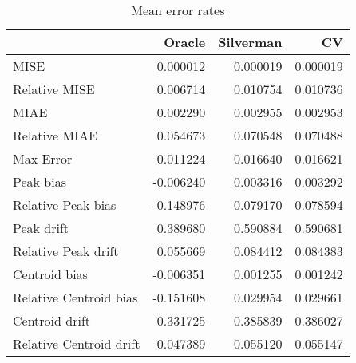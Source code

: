 \begin{table}[ht]
\centering
\begin{tabular}{lrrr}
  \hline
 & Oracle & Silverman & CV \\ 
  \hline
MISE & 0.000012 & 0.000019 & 0.000019 \\ 
  Relative MISE & 0.006714 & 0.010754 & 0.010736 \\ 
  MIAE & 0.002290 & 0.002955 & 0.002953 \\ 
  Relative MIAE & 0.054673 & 0.070548 & 0.070488 \\ 
  Max Error & 0.011224 & 0.016640 & 0.016621 \\ 
  Peak bias & -0.006240 & 0.003316 & 0.003292 \\ 
  Relative Peak bias & -0.148976 & 0.079170 & 0.078594 \\ 
  Peak drift & 0.389680 & 0.590884 & 0.590681 \\ 
  Relative Peak drift & 0.055669 & 0.084412 & 0.084383 \\ 
  Centroid bias & -0.006351 & 0.001255 & 0.001242 \\ 
  Relative Centroid bias & -0.151608 & 0.029954 & 0.029661 \\ 
  Centroid drift & 0.331725 & 0.385839 & 0.386027 \\ 
  Relative Centroid drift & 0.047389 & 0.055120 & 0.055147 \\ 
   \hline
\end{tabular}
\caption{Mean error rates} 
\label{tbl:mean_error_rates}
\end{table}
